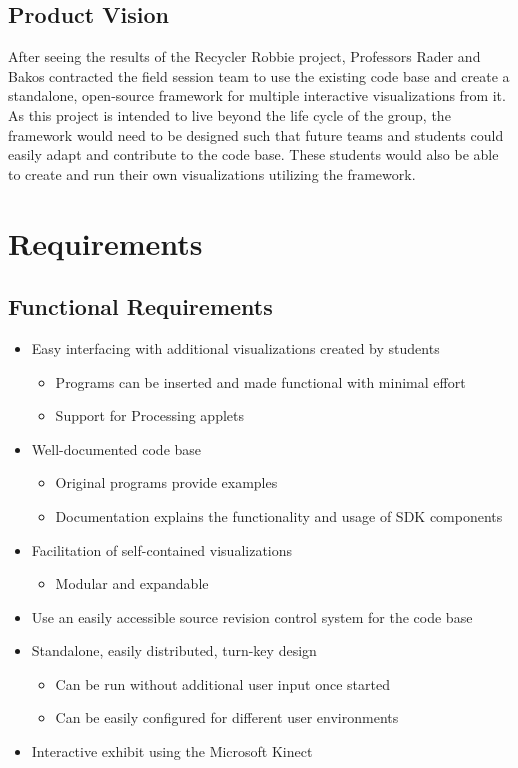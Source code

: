 \documentclass[11pt,letterpaper]{article}
\begin{document}
	\subsection{Product Vision}
	After seeing the results of the Recycler Robbie project, Professors Rader 
	and Bakos contracted the field session team to use the existing code base 
	and create a standalone, open-source framework for multiple interactive 
	visualizations from it. As this project is intended to live beyond the 
	life cycle of the group, the framework would need to be designed such that 
	future teams and students could easily adapt and contribute to the code 
	base. These students would also be able to create and run their own 
	visualizations utilizing the framework. 
	\pagebreak
 
	\section{Requirements}
	\subsection{Functional Requirements}
	\begin{itemize}
		\item Easy interfacing with additional visualizations created by students
		\begin{itemize}
			\item Programs can be inserted and made functional with minimal effort
			\item Support for Processing applets
		\end{itemize}
		\item Well-documented code base
		\begin{itemize}
			\item Original programs provide examples
			\item Documentation explains the functionality and usage of SDK components
		\end{itemize}
		\item Facilitation of self-contained visualizations
		\begin{itemize}
			\item Modular and expandable
		\end{itemize}
		\item Use an easily accessible source revision control system for the code base
		\item Standalone, easily distributed, turn-key design
		\begin{itemize}
			\item Can be run without additional user input once started
			\item Can be easily configured for different user environments
		\end{itemize}
		\item Interactive exhibit using the Microsoft Kinect
	\end{itemize}
\end{document}
